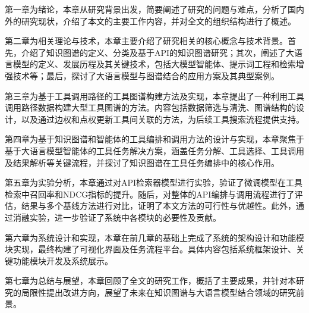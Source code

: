   \indent 第一章为绪论，本章从研究背景出发，简要阐述了研究的问题与难点，分析了国内外的研究现状，介绍了本文的主要工作内容，并对全文的组织结构进行了概述。

  \indent 第二章为相关理论与技术，本章主要介绍了研究相关的核心概念与技术背景。首先，介绍了知识图谱的定义、分类及基于API的知识图谱研究；其次，阐述了大语言模型的定义、发展历程及其关键技术，包括大模型智能体、提示词工程和检索增强技术等；最后，探讨了大语言模型与图谱结合的应用方案及其典型案例。
  
  \indent 第三章为基于工具调用路径的工具图谱构建方法及实现，本章提出了一种利用工具调用路径数据构建大型工具图谱的方法。内容包括数据筛选与清洗、图谱结构的设计，以及通过边权和点权更新工具间关联的方法，为后续工具搜索流程提供支持。
  
  \indent 第四章为基于知识图谱和智能体的工具编排和调用方法的设计与实现，本章聚焦于基于大语言模型智能体的工具任务解决方案，涵盖任务分解、工具选择、工具调用及结果解析等关键流程，并探讨了知识图谱在工具任务编排中的核心作用。
  
  \indent 第五章为实验分析，本章通过对API检索器模型进行实验，验证了微调模型在工具检索中召回率和NDCG指标的提升。随后，对整体的API编排与调用流程进行了评估，结果与多个基线方法进行对比，证明了本文方法的可行性与优越性。此外，通过消融实验，进一步验证了系统中各模块的必要性及贡献。
  
  \indent 第六章为系统设计和实现，本章在前几章的基础上完成了系统的架构设计和功能模块实现，最终构建了可视化界面及任务流程平台。具体内容包括系统框架设计、关键功能模块开发及系统展示。
  
  \indent 第七章为总结与展望，本章回顾了全文的研究工作，概括了主要成果，并针对本研究的局限性提出改进方向，展望了未来在知识图谱与大语言模型结合领域的研究前景。